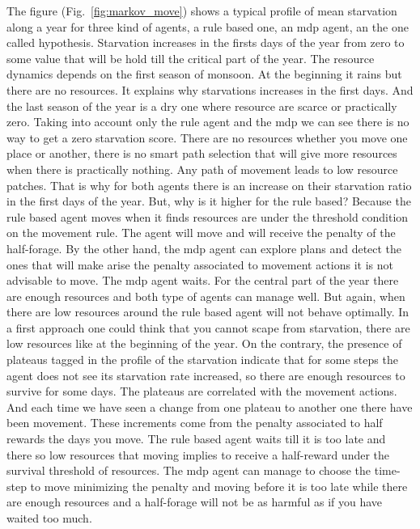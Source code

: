 \documentclass[11pt,oneside,a4paper,openright]{report}
\begin{document}
The figure (Fig.~\ref{fig:markov_move}) shows a typical profile of mean starvation along a year for three kind 
of agents, a rule based one, an mdp agent, an the one called hypothesis. Starvation increases in the firsts 
days of the year from zero to some value that will be hold till the critical part of the year. The resource 
dynamics depends on the first season of monsoon. At the beginning it rains but there are no resources. It 
explains why starvations increases in the first days. And the last season of the year is a dry one where 
resource are scarce or practically zero. Taking into account only the rule agent and the mdp we can see there 
is no way to get a zero starvation score. There are no resources whether you move one place or another, there 
is no smart path selection that will give more resources when there is practically nothing. Any path of 
movement leads to low resource patches. That is why for both agents there is an increase on their starvation 
ratio in the first days of the year. But, why is it higher for the rule based? Because the rule based agent 
moves when it finds resources are under the threshold condition on the movement rule. The agent will move and 
will receive the penalty of the half-forage. By the other hand, the mdp agent can explore plans and detect the
ones that will make arise the penalty associated to movement actions it is not advisable to move. The mdp 
agent waits. For the central part of the year there are enough resources and both type of agents can manage 
well. But again, when there are low resources around the rule based agent will not behave optimally. In a 
first approach one could think that you cannot scape from starvation, there are low resources like at the 
beginning of the year. On the contrary, the presence of plateaus tagged in the profile of the starvation indicate 
that for some steps the agent does not see its starvation rate increased, so there are enough resources to 
survive for some days. The plateaus are correlated with the movement actions. And each time we have seen a 
change from one plateau to another one there have been movement. These increments come from the penalty 
associated to half rewards the days you move. The rule based agent waits till it is too late and there so low 
resources that moving implies to receive a half-reward under the survival threshold of resources. 
The mdp agent can manage to choose the time-step to move minimizing the penalty and moving before it is too 
late while there are enough resources and a half-forage will not be as harmful as if you have waited too much. 
\end{document}
